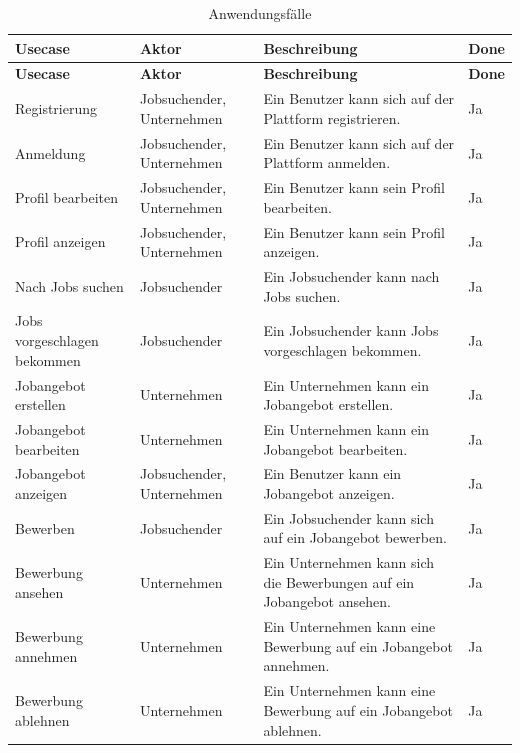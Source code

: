 \documentclass[12pt, letterpaper]{article}
\begin{document}
    \begin{longtable}[htbp]{|p{}|p{}|p{}|p{}|}
       
        \hline
        \textbf{Usecase}&\textbf{Aktor}&\textbf{Beschreibung}&\textbf{Done}\\
        \hline
        \hline
        \endfirsthead

        \hline
        \textbf{Usecase}&\textbf{Aktor}&\textbf{Beschreibung}&\textbf{Done}\\
        \hline
        \hline
        \endhead

        \hline
        \endfoot

        \hline
        \caption{Anwendungsfälle}  \label{tab:Anwendungsfaelle} 
        \endlastfoot
        Registrierung& Jobsuchender, Unternehmen & Ein Benutzer kann sich auf der Plattform registrieren. & Ja \\
        \hline
        Anmeldung& Jobsuchender, Unternehmen & Ein Benutzer kann sich auf der Plattform anmelden. & Ja \\
        \hline
        Profil bearbeiten& Jobsuchender, Unternehmen & Ein Benutzer kann sein Profil bearbeiten. & Ja \\
        \hline
        Profil anzeigen& Jobsuchender, Unternehmen & Ein Benutzer kann sein Profil anzeigen. & Ja \\
        \hline
        Nach Jobs suchen& Jobsuchender & Ein Jobsuchender kann nach Jobs suchen. & Ja \\
        \hline
        Jobs vorgeschlagen bekommen& Jobsuchender & Ein Jobsuchender kann Jobs vorgeschlagen bekommen. & Ja \\
        \hline
        Jobangebot erstellen& Unternehmen & Ein Unternehmen kann ein Jobangebot erstellen. & Ja \\
        \hline
        Jobangebot bearbeiten& Unternehmen & Ein Unternehmen kann ein Jobangebot bearbeiten. & Ja \\
        \hline
        Jobangebot anzeigen& Jobsuchender, Unternehmen & Ein Benutzer kann ein Jobangebot anzeigen. & Ja \\
        \hline
        Bewerben& Jobsuchender & Ein Jobsuchender kann sich auf ein Jobangebot bewerben. & Ja \\
        \hline
        Bewerbung ansehen& Unternehmen & Ein Unternehmen kann sich die Bewerbungen auf ein Jobangebot ansehen. & Ja \\
        \hline
        Bewerbung annehmen& Unternehmen & Ein Unternehmen kann eine Bewerbung auf ein Jobangebot annehmen. & Ja \\
        \hline
        Bewerbung ablehnen& Unternehmen & Ein Unternehmen kann eine Bewerbung auf ein Jobangebot ablehnen. & Ja \\
    \end{longtable}
\end{document}
